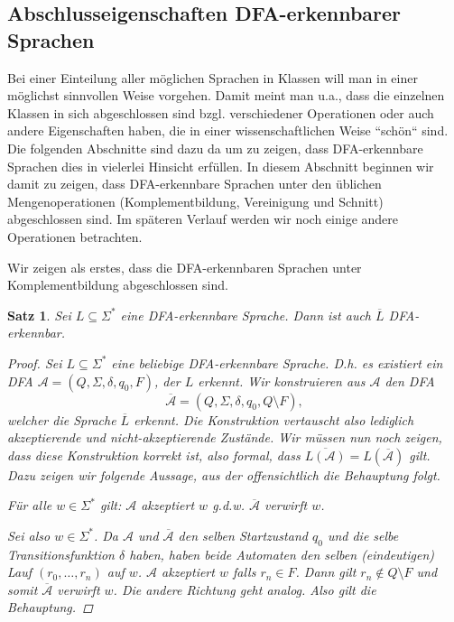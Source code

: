 \documentclass[11pt, a4paper]{article}
\theoremstyle{definition}
\theoremstyle{plain}
\newtheorem{theorem}[definition]{Satz}
\numberwithin{equation}{section}
\newcommand{\comp}[1]{\overline{#1}}
\begin{document}
\subsection{Abschlusseigenschaften DFA-erkennbarer Sprachen}\label{sec:regular_closure}
Bei einer Einteilung aller möglichen Sprachen in Klassen will man in einer möglichst sinnvollen Weise vorgehen. Damit meint man u.a., dass die einzelnen Klassen in sich abgeschlossen sind bzgl. verschiedener Operationen oder auch andere Eigenschaften haben, die in einer wissenschaftlichen Weise ``schön`` sind. Die folgenden Abschnitte sind dazu da um zu zeigen, dass DFA-erkennbare Sprachen dies in vielerlei Hinsicht erfüllen. In diesem Abschnitt beginnen wir damit zu zeigen, dass DFA-erkennbare Sprachen unter den üblichen Mengenoperationen (Komplementbildung, Vereinigung und Schnitt) abgeschlossen sind. Im späteren Verlauf werden wir noch einige andere Operationen betrachten.\par
Wir zeigen als erstes, dass die DFA-erkennbaren Sprachen unter Komplementbildung abgeschlossen sind.
\begin{theorem}\label{thm:regular_complement}
	Sei \( L \subseteq \Sigma^\ast \) eine DFA-erkennbare Sprache. Dann ist auch \( \comp{L} \) DFA-erkennbar.
	\begin{proof}
		Sei \( L \subseteq \Sigma^\ast \) eine beliebige DFA-erkennbare Sprache. D.h. es existiert ein DFA \( \mathcal{A} = (Q, \Sigma, \delta, q_0, F) \), der \( L \) erkennt. Wir konstruieren aus \( \mathcal{A} \) den DFA
		\[
			\comp{\mathcal{A}} = (Q, \Sigma, \delta, q_0, Q \setminus F),
		\]
		welcher die Sprache \( \comp{L} \) erkennt. Die Konstruktion vertauscht also lediglich akzeptierende und nicht-akzeptierende Zustände. Wir müssen nun noch zeigen, dass diese Konstruktion korrekt ist, also formal, dass \( \comp{L(\mathcal{A})} = L(\comp{\mathcal{A}}) \) gilt. Dazu zeigen wir folgende Aussage, aus der offensichtlich die Behauptung folgt.
		\begin{center}
			Für alle \( w \in \Sigma^\ast \) gilt: \( \mathcal{A} \) akzeptiert \( w \) {g.d.w.} \( \comp{\mathcal{A}} \) verwirft \( w \).
		\end{center}
		Sei also \( w \in \Sigma^\ast \). Da \( \mathcal{A} \) und \( \comp{\mathcal{A}} \) den selben Startzustand \( q_0 \) und die selbe Transitionsfunktion \( \delta \) haben, haben beide Automaten den selben (eindeutigen) Lauf \( (r_0, \ldots, r_n) \) auf \( w \). \( \mathcal{A} \) akzeptiert \( w \) falls \( r_n \in F \). Dann gilt \( r_n \notin Q \setminus F \) und somit \( \comp{\mathcal{A}} \) verwirft \( w \). Die andere Richtung geht analog. Also gilt die Behauptung.
	\end{proof}
\end{theorem}
\end{document}
